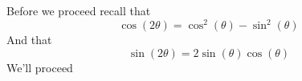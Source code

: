 \documentclass[11pt]{article}
\begin{document}
Before we proceed recall that 
\[
\cos  \left( 2\theta  \right) = \cos ^2  \left( \theta \right)  - \sin ^2  \left( \theta \right) 
\]
And that 
\[
\sin   \left( 2\theta \right) = 2\sin  \left( \theta \right) \cos  \left( \theta \right) 
\]
We'll proceed 



\begin{align*}
\end{align*}
\end{document}
